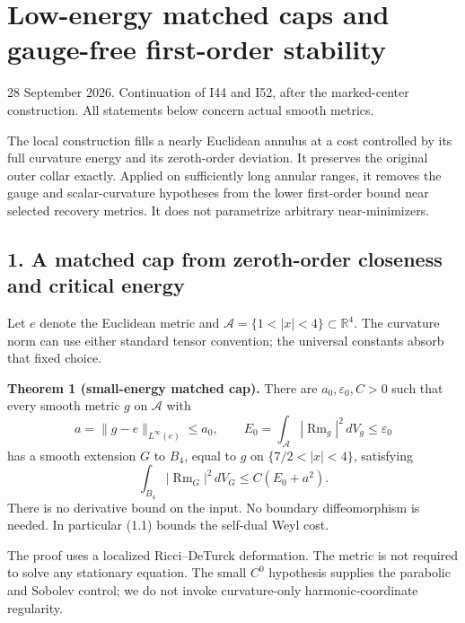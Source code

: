 \documentclass[
  11pt,
]{article}
\author{}
\date{}
\begin{document}
\hypertarget{low-energy-matched-caps-and-gauge-free-first-order-stability}{%
\section{Low-energy matched caps and gauge-free first-order
stability}\label{low-energy-matched-caps-and-gauge-free-first-order-stability}}

28 September 2026. Continuation of I44 and I52, after the marked-center
construction. All statements below concern actual smooth metrics.

The local construction fills a nearly Euclidean annulus at a cost
controlled by its full curvature energy and its zeroth-order deviation.
It preserves the original outer collar exactly. Applied on sufficiently
long annular ranges, it removes the gauge and scalar-curvature
hypotheses from the lower first-order bound near selected recovery
metrics. It does not parametrize arbitrary near-minimizers.

\hypertarget{a-matched-cap-from-zeroth-order-closeness-and-critical-energy}{%
\subsection{1. A matched cap from zeroth-order closeness and critical
energy}\label{a-matched-cap-from-zeroth-order-closeness-and-critical-energy}}

Let \(e\) denote the Euclidean metric and
\(\mathcal A=\{1<|x|<4\}\subset\mathbb R^4\). The curvature norm can use
either standard tensor convention; the universal constants absorb that
fixed choice.

\textbf{Theorem 1 (small-energy matched cap).} There are
\(a_0,\varepsilon_0,C>0\) such that every smooth metric \(g\) on
\(\mathcal A\) with \[
 a=\|g-e\|_{L^\infty(e)}\le a_0,\qquad
 E_0=\int_{\mathcal A}|\operatorname{Rm}_g|^2\,dV_g
          \le\varepsilon_0
\] has a smooth extension \(G\) to \(B_4\), equal to \(g\) on
\(\{7/2<|x|<4\}\), satisfying \[
 \int_{B_4}|\operatorname{Rm}_G|^2\,dV_G
                         \le C(E_0+a^2).                    \tag{1.1}
\] There is no derivative bound on the input. No boundary diffeomorphism
is needed. In particular (1.1) bounds the self-dual Weyl cost.

The proof uses a localized Ricci--DeTurck deformation. The metric is not
required to solve any stationary equation. The small \(C^0\) hypothesis
supplies the parabolic and Sobolev control; we do not invoke
curvature-only harmonic-coordinate regularity.
\end{document}
